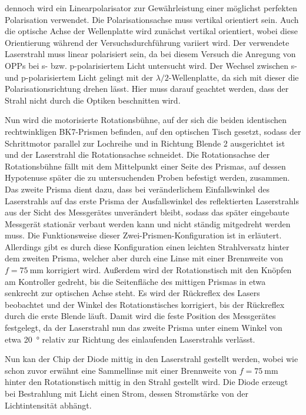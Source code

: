 dennoch wird ein Linearpolarisator zur Gewährleistung einer möglichst perfekten Polarisation verwendet. Die Polarisationsachse muss vertikal orientiert sein.
Auch die optische Achse der Wellenplatte wird zunächst vertikal orientiert, wobei diese Orientierung während der Versuchsdurchführung variiert wird. Der
verwendete Laserstrahl muss linear polarisiert sein, da bei diesem Versuch die Anregung von OPPs bei s- bzw. p-polarisiertem Licht untersucht wird. Der Wechsel
zwischen s- und p-polarisiertem Licht gelingt mit der $\lambda/2$-Wellenplatte, da sich mit dieser die Polarisationsrichtung drehen lässt. Hier muss darauf geachtet werden,
dass der Strahl nicht durch die Optiken beschnitten wird.\par
Nun wird die motorisierte Rotationsbühne, auf der sich die beiden identischen rechtwinkligen BK7-Prismen befinden, auf den optischen Tisch gesetzt, sodass der
Schrittmotor parallel zur Lochreihe und in Richtung Blende 2 ausgerichtet ist und der Laserstrahl die Rotationsachse schneidet. Die Rotationsachse der Rotationsbühne fällt
mit dem Mittelpunkt einer Seite des Prismas, auf dessen Hypotenuse später die zu untersuchenden Proben befestigt werden, zusammen. Das zweite Prisma dient dazu,
dass bei veränderlichem Einfallswinkel des Laserstrahls auf das erste Prisma der Ausfallswinkel des reflektierten Laserstrahls aus der Sicht des Messgerätes unverändert bleibt,
sodass das später eingebaute Messgerät stationär verbaut werden kann und nicht ständig mitgedreht werden muss. Die Funktionsweise dieser Zwei-Prismen-Konfiguration
ist in \cite{prism} erläutert. Allerdings gibt es durch diese Konfiguration einen leichten Strahlversatz hinter dem zweiten Prisma, welcher aber durch eine Linse
mit einer Brennweite von $f = \SI{75}{\mm}$ korrigiert wird. Außerdem wird der Rotationstisch mit den Knöpfen am Kontroller gedreht, bis die Seitenfläche des mittigen Prismas
in etwa senkrecht zur optischen Achse steht. Es wird der Rückreflex des Lasers beobachtet und der Winkel des Rotationstisches korrigiert, bis der Rückreflex durch
die erste Blende läuft. Damit wird die feste Position des Messgerätes festgelegt, da der Laserstrahl nun das zweite Prisma unter einem Winkel von etwa \SI{20}{\degree}
relativ zur Richtung des einlaufenden Laserstrahls verlässt.\par
Nun kan der Chip der Diode mittig in den Laserstrahl gestellt werden, wobei wie schon zuvor erwähnt eine Sammellinse mit einer Brennweite von $f = \SI{75}{\mm}$ hinter
den Rotationstisch mittig in den Strahl gestellt wird. Die Diode erzeugt bei Bestrahlung mit Licht einen Strom, dessen Stromstärke von der Lichtintensität abhängt.
